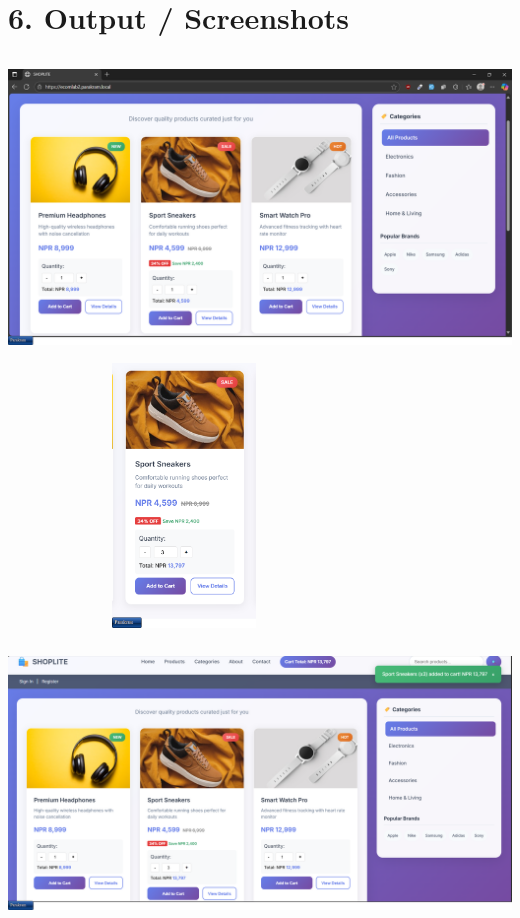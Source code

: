 \documentclass[a4paper,12pt]{article}
\begin{document}
\section*{6. Output / Screenshots}
\begin{center}
\includegraphics[width=\textwidth,height=8cm,keepaspectratio]{images/output1.png} 
\includegraphics[width=0.7\textwidth, height=7cm, keepaspectratio]{images/output2.png}
\includegraphics[width=\textwidth,height=8cm,keepaspectratio]{images/output3.png} 

\end{center}
\end{document}
